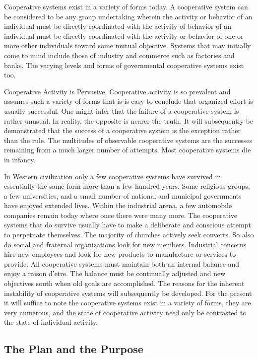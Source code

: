 Cooperative systems exist in a variety of forms today. A cooperative system can be considered to be any group undertaking wherein the activity or behavior of an individual must be directly coordinated with the activity of behavior of an individual must be directly coordinated with the activity or behavior of one or more other individuals toward some mutual objective. Systems that may initially come to mind include those of industry and commerce such as factories and banks. The varying levels and forms of governmental cooperative systems exist too.

Cooperative Activity is Pervasive. Cooperative activity is so prevalent and assumes such a variety of forms that is is easy to conclude that organized effort is usually successful. One might infer that the failure of a cooperative system is rather unusual. In reality, the opposite is nearer the truth. It will subsequently be demonstrated that the success of a cooperative system is the exception rather than the rule. The multitudes of observable cooperative systems are the successes remaining from a much larger number of attempts. Most cooperative systems die in infancy.

In Western civilization only a few cooperative systems have survived in essentially the same form more than a few hundred years. Some religious groups, a few universities, and a small number of national and municipal governments have enjoyed extended lives. Within the industrial arena, a few automobile companies remain today where once there were many more. The cooperative systems that do survive usually have to make a deliberate and conscious attempt to perpetuate themselves. The majority of churches actively seek converts. So also do social and fraternal organizations look for new members. Industrial concerns hire new employees and look for new products to manufacture or services to provide. All cooperative systems must maintain both an internal balance and enjoy a raison d’etre. The balance must be continually adjusted and new objectives south when old goals are accomplished. The reasons for the inherent instability of cooperative systems will subsequently be developed. For the present it will suffice to note the cooperative systems exist in a variety of forms, they are very numerous, and the state of cooperative activity need only be contrasted to the state of individual activity.

\subsection{The Plan and the Purpose}


